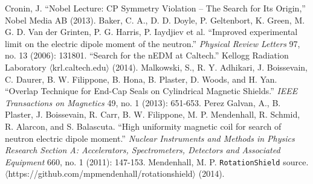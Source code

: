 \documentclass[twocolumn,aps,prb,citeautoscript]{revtex4-1}
\begin{document}
\begin{thebibliography}{}
 Cronin, J. ``Nobel Lecture: CP Symmetry Violation – The Search
for Its Origin,'' Nobel Media AB (2013).
 Baker, C. A., D. D. Doyle, P. Geltenbort, K. Green, M. G. D. Van der Grinten, P. G. Harris, P. Iaydjiev et al. ``Improved experimental limit on the electric dipole moment of the neutron.'' \textit{Physical Review Letters} 97, no. 13 (2006): 131801.
 ``Search for the nEDM at Caltech.'' Kellogg Radiation Laboratory
$\langle$krl.caltech.edu$\rangle$ (2014).
 Malkowski, S., R. Y. Adhikari, J. Boissevain, C. Daurer, B. W. Filippone, B. Hona, B. Plaster, D. Woods, and H. Yan. ``Overlap Technique for End-Cap Seals on Cylindrical Magnetic Shields.'' \textit{IEEE Transactions on Magnetics} 49, no. 1 (2013): 651-653.
 Perez Galvan, A., B. Plaster, J. Boissevain, R. Carr, B. W. Filippone, M. P. Mendenhall, R. Schmid, R. Alarcon, and S. Balascuta. ``High uniformity magnetic coil for search of neutron electric dipole moment.'' \textit{Nuclear Instruments and Methods in Physics Research Section A: Accelerators, Spectrometers, Detectors and Associated Equipment} 660, no. 1 (2011): 147-153.
 Mendenhall, M. P. \texttt{RotationShield} source. $\langle$https://github.com/mpmendenhall/rotationshield$\rangle$ (2014).
\end{thebibliography}
\end{document}
